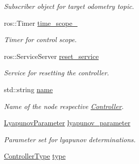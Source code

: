 \begin{DoxyCompactItemize}
\begin{DoxyCompactList}\small\item\em Subscriber object for target odometry topic. \end{DoxyCompactList}\item 
ros\+::\+Timer \hyperlink{classController_a96e34ca6ebe5b7c8035982ff98270f4b}{time\+\_\+scope\+\_\+}\hypertarget{classController_a96e34ca6ebe5b7c8035982ff98270f4b}{}\label{classController_a96e34ca6ebe5b7c8035982ff98270f4b}

\begin{DoxyCompactList}\small\item\em Timer for control scope. \end{DoxyCompactList}\item 
ros\+::\+Service\+Server \hyperlink{classController_ae981013bac649b6310e924b6a126bc40}{reset\+\_\+service}\hypertarget{classController_ae981013bac649b6310e924b6a126bc40}{}\label{classController_ae981013bac649b6310e924b6a126bc40}

\begin{DoxyCompactList}\small\item\em Service for resetting the controller. \end{DoxyCompactList}\item 
std\+::string \hyperlink{classController_af81f22d8b64d915769acfb8e8d89e0c8}{name}\hypertarget{classController_af81f22d8b64d915769acfb8e8d89e0c8}{}\label{classController_af81f22d8b64d915769acfb8e8d89e0c8}

\begin{DoxyCompactList}\small\item\em Name of the node respective \hyperlink{classController}{Controller}. \end{DoxyCompactList}\item 
\hyperlink{structController_1_1LyapunovParameter}{Lyapunov\+Parameter} \hyperlink{classController_a8069db2319ff64d65607b1aa897d3069}{lyapunov\+\_\+parameter}\hypertarget{classController_a8069db2319ff64d65607b1aa897d3069}{}\label{classController_a8069db2319ff64d65607b1aa897d3069}

\begin{DoxyCompactList}\small\item\em Parameter set for lyapunov determinations. \end{DoxyCompactList}\item 
\hyperlink{classController_aa6d956c4c220461a4152415ffa78690a}{Controller\+Type} \hyperlink{classController_a17792cff397dc69baca568c7d03f2fc8}{type}\hypertarget{classController_a17792cff397dc69baca568c7d03f2fc8}{}\label{classController_a17792cff397dc69baca568c7d03f2fc8}


\end{DoxyCompactItemize}
